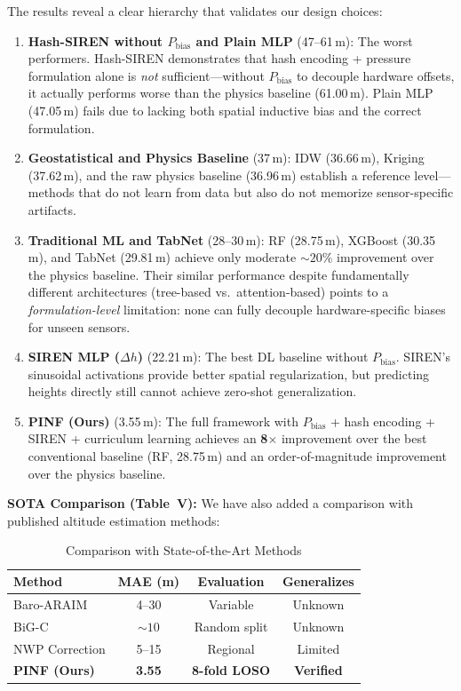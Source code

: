 The results reveal a clear hierarchy that validates our design choices:
\begin{enumerate}
    \item \textbf{Hash-SIREN without $P_{\text{bias}}$ and Plain MLP} (47--61\,m): The worst performers. Hash-SIREN demonstrates that hash encoding + pressure formulation alone is \emph{not} sufficient---without $P_{\text{bias}}$ to decouple hardware offsets, it actually performs worse than the physics baseline (61.00\,m). Plain MLP (47.05\,m) fails due to lacking both spatial inductive bias and the correct formulation.
    \item \textbf{Geostatistical and Physics Baseline} (37\,m): IDW (36.66\,m), Kriging (37.62\,m), and the raw physics baseline (36.96\,m) establish a reference level---methods that do not learn from data but also do not memorize sensor-specific artifacts.
    \item \textbf{Traditional ML and TabNet} (28--30\,m): RF (28.75\,m), XGBoost (30.35\,m), and TabNet (29.81\,m) achieve only moderate ${\sim}20\%$ improvement over the physics baseline. Their similar performance despite fundamentally different architectures (tree-based vs.\ attention-based) points to a \emph{formulation-level} limitation: none can fully decouple hardware-specific biases for unseen sensors.
    \item \textbf{SIREN MLP ($\Delta h$)} (22.21\,m): The best DL baseline without $P_{\text{bias}}$. SIREN's sinusoidal activations provide better spatial regularization, but predicting heights directly still cannot achieve zero-shot generalization.
    \item \textbf{PINF (Ours)} (3.55\,m): The full framework with $P_{\text{bias}}$ + hash encoding + SIREN + curriculum learning achieves an \textbf{8$\times$} improvement over the best conventional baseline (RF, 28.75\,m) and an order-of-magnitude improvement over the physics baseline.
\end{enumerate}

\textbf{SOTA Comparison (Table~V):}
We have also added a comparison with published altitude estimation methods:

\begin{table}[h]
\centering
\caption{Comparison with State-of-the-Art Methods}
\begin{tabular}{lccc}
\toprule
\textbf{Method} & \textbf{MAE (m)} & \textbf{Evaluation} & \textbf{Generalizes} \\
\midrule
Baro-ARAIM \cite{simonetti2024geodetic} & 4--30 & Variable & Unknown \\
BiG-C \cite{narayanan2022enhanced} & ${\sim}10$ & Random split & Unknown \\
NWP Correction \cite{schumann2017use} & 5--15 & Regional & Limited \\
\midrule
\textbf{PINF (Ours)} & \textbf{3.55} & \textbf{8-fold LOSO} & \textbf{Verified} \\
\bottomrule
\end{tabular}
\end{table}

